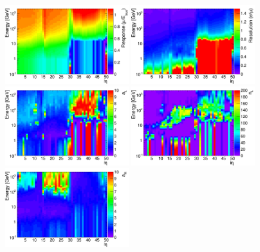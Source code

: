 \begin{figure}[hbtp]
\begin{center}
\includegraphics[width=0.49\textwidth]{figures/mu_tot_interp.png}
\includegraphics[width=0.49\textwidth]{figures/sigma_tot_interp.png}
\includegraphics[width=0.49\textwidth]{figures/aL_tot_interp.png}
\includegraphics[width=0.49\textwidth]{figures/nL_tot_interp.png}
\includegraphics[width=0.49\textwidth]{figures/aR_tot_interp.png}

\end{center}
\end{figure}
